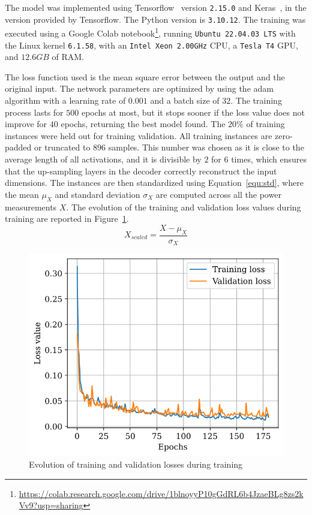 The model was implemented using Tensorflow~\parencite{abadiTensorFlowLargeScaleMachine2016,tensorflowdevelopersTensorFlow2023} version \texttt{2.15.0} and Keras~\parencite{cholletKeras2015}, in the version provided by Tensorflow. The Python version is \texttt{3.10.12}. The training was executed using a Google Colab notebook\footnote{\url{https://colab.research.google.com/drive/1blnoyyP10gGdRL6b4JzaeBLg8zs2kVv9?usp=sharing}}, running \texttt{Ubuntu 22.04.03 LTS} with the Linux kernel \texttt{6.1.58}, with an \texttt{Intel Xeon 2.00GHz} CPU, a \texttt{Tesla T4} GPU, and $12.6GB$ of RAM.

The loss function used is the mean square error between the output and the original input. The network parameters are optimized by using the \acrfull{adam} algorithm with a learning rate of $0.001$ and a batch size of $32$. The training process lasts for $500$ epochs at most, but it stops sooner if the loss value does not improve for $40$ epochs, returning the best model found. The $20\%$ of training instances were held out for training validation. All training instances are zero-padded or truncated to $896$ samples. This number was chosen as it is close to the average length of all activations, and it is divisible by $2$ for $6$ times, which ensures that the up-sampling layers in the decoder correctly reconstruct the input dimensions. The instances are then standardized using Equation~\eqref{equ:std}, where the mean $\mu_X$ and standard deviation $\sigma_X$ are computed across all the power measurements $X$. The evolution of the training and validation loss values during training are reported in Figure~\ref{fig:autoencoder_losses}.
\begin{equation}\label{equ:std}
  X_{scaled} = \frac{X - \mu_X}{\sigma_X}
\end{equation}

\begin{figure}
  \centering
  \includegraphics[width=.6\linewidth]{images/modes_clustering/loss.png}
  \caption{Evolution of training and validation losses during training}
  \label{fig:autoencoder_losses}
\end{figure}

